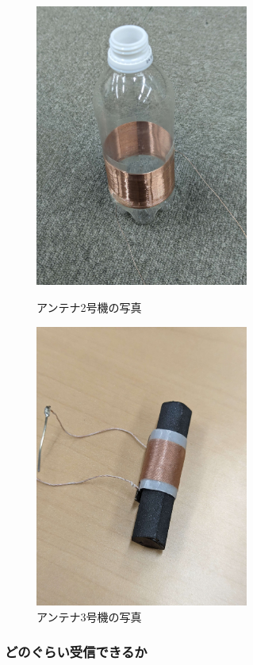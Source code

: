 \documentclass[report.tex]{subfiles}
\begin{document}
\begin{figure}[H]
	\begin{minipage}[b]{0.5\linewidth}
		\centering
		\includegraphics[width=7cm]{fig/2.jpg}
		\caption{アンテナ2号機の写真}
		\label{fig:2}
	\end{minipage}
	\begin{minipage}[b]{0.5\linewidth}
		\centering
		\includegraphics[width=7cm]{fig/3.jpg}
		\caption{アンテナ3号機の写真}
		\label{fig:3}
	\end{minipage}
\end{figure}

\subsubsection{どのぐらい受信できるか}
\end{document}
